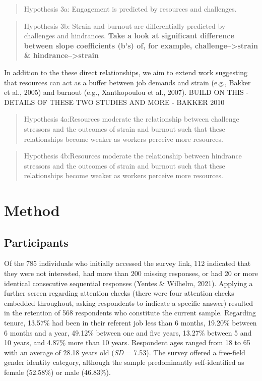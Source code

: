 \documentclass[
  man,mask]{apa7}
\begin{document}
\begin{quote}
Hypothesis 3a: Engagement is predicted by resources and challenges.
\end{quote}

\begin{quote}
Hypothesis 3b: Strain and burnout are differentially predicted by challenges and hindrances. \textbf{Take a look at significant difference between slope coefficients (b's) of, for example, challenge--\textgreater strain \& hindrance--\textgreater strain}
\end{quote}

In addition to the these direct relationships, we aim to extend work suggesting that resources can act as a buffer between job demands and strain (e.g., Bakker et al., 2005) and burnout (e.g., Xanthopoulou et al., 2007). BUILD ON THIS - DETAILS OF THESE TWO STUDIES AND MORE - BAKKER 2010

\begin{quote}
Hypothesis 4a:Resources moderate the relationship between challenge stressors and the outcomes of strain and burnout such that these relationships become weaker as workers perceive more resources.
\end{quote}

\begin{quote}
Hypothesis 4b:Resources moderate the relationship between hindrance stressors and the outcomes of strain and burnout such that these relationships become weaker as workers perceive more resources.
\end{quote}

\hypertarget{method}{%
\section{Method}\label{method}}

\hypertarget{participants}{%
\subsection{Participants}\label{participants}}

Of the 785 individuals who initially accessed the survey link, 112 indicated that they were not interested, had more than 200 missing responses, or had 20 or more identical consecutive sequential responses (Yentes \& Wilhelm, 2021). Applying a further screen regarding attention checks (there were four attention checks embedded throughout, asking respondents to indicate a specific answer) resulted in the retention of 568 respondents who constitute the current sample. Regarding tenure, 13.57\% had been in their referent job less than 6 months, 19.20\% between 6 months and a year, 49.12\% between one and five years, 13.27\% between 5 and 10 years, and 4.87\% more than 10 years. Respondent ages ranged from 18 to 65 with an average of 28.18 years old (\emph{SD} = 7.53). The survey offered a free-field gender identity category, although the sample predominantly self-identified as female (52.58\%) or male (46.83\%).
\end{document}
